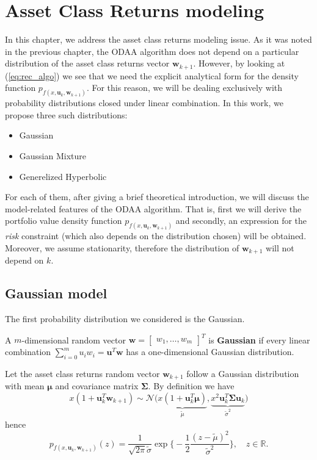 \chapter{Asset Class Returns modeling}\label{chpt:assetclass_returns}
	
In this chapter, we address the asset class returns modeling issue. As it was noted in the previous chapter, the \gls{ODAA} algorithm does not depend on a particular distribution of the asset class returns vector $\bm{w}_{k+1}$. However, by looking at (\ref{eq:rec_algo}) we see that we need the explicit analytical form for the density function $p_{f(x,\bm{u}_k,\bm{w}_{k+1})}$. For this reason, we will be dealing exclusively with probability distributions closed under linear combination. In this work, we propose three such distributions:
\begin{itemize}
	\item Gaussian
	\item Gaussian Mixture
	\item Generelized Hyperbolic
\end{itemize}
For each of them, after giving a brief theoretical introduction, we will discuss the model-related features of the \gls{ODAA} algorithm. That is, first we will derive the portfolio value density function $p_{f(x,\bm{u}_k,\bm{w}_{k+1})}$ and secondly, an expression for the \textit{risk} constraint (which also depends on the distribution chosen) will be obtained. Moreover, we assume stationarity, therefore the distribution of $\bm{w}_{k+1}$ will not depend on $k$.
\section{Gaussian model}
The first probability distribution we considered is the Gaussian. 
\begin{definition}\label{def:gauss_rv}
	A $m$-dimensional random vector $\bm{w} = \begin{bmatrix}w_1,\ldots,w_m\end{bmatrix}^T$ is \textbf{Gaussian} if every linear combination $\sum_{i=0}^{m}u_iw_i = \bm{u}^T \bm{w}$ has a one-dimensional Gaussian distribution.
\end{definition}
Let the asset class returns random vector $\bm{w}_{k+1}$ follow a Gaussian distribution with mean $\bm{\mu}$ and covariance matrix $\bm{\Sigma}$. By definition we have \[x(1 + \bm{u}_k^T \bm{w}_{k+1}) \sim \mathcal{N}\Big(\underbrace{x(1 + \bm{u}_k^T \bm{\mu})}_{\tilde{\mu}}, \underbrace{x^2\bm{u}_k^T \bm{\Sigma} \bm{u}_k}_{\tilde{\sigma}^2}\Big)\]
hence
\begin{equation}
\boxed{p_{f(x,\bm{u}_k,\bm{w}_{k+1})}(z) =  \frac{1}{\sqrt{2\pi}\tilde{\sigma}}\exp\bigg\{ -\frac{1}{2}\frac{(z-\tilde{\mu})^2}{\tilde{\sigma}^2}\bigg\}, \quad z \in \mathbb{R}.}
\end{equation}
 

